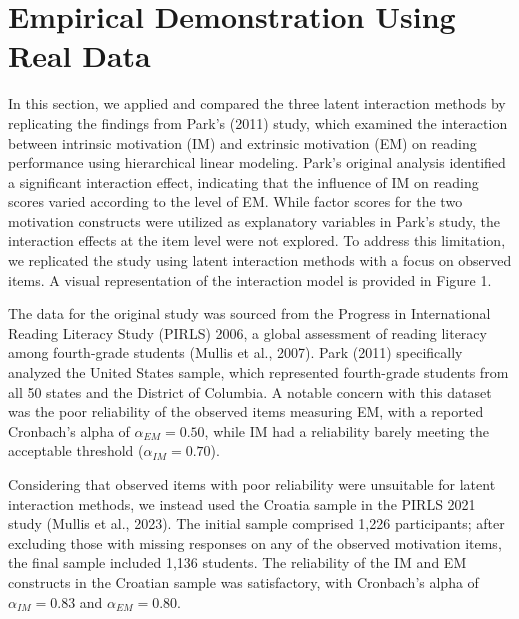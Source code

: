\documentclass[
  man,mask]{apa6}
\begin{document}
\section{Empirical Demonstration Using Real Data}\label{empirical-demonstration-using-real-data}

In this section, we applied and compared the three latent interaction methods by replicating the findings from Park's (2011) study, which examined the interaction between intrinsic motivation (IM) and extrinsic motivation (EM) on reading performance using hierarchical linear modeling. Park's original analysis identified a significant interaction effect, indicating that the influence of IM on reading scores varied according to the level of EM. While factor scores for the two motivation constructs were utilized as explanatory variables in Park's study, the interaction effects at the item level were not explored. To address this limitation, we replicated the study using latent interaction methods with a focus on observed items. A visual representation of the interaction model is provided in Figure 1.

The data for the original study was sourced from the Progress in International Reading Literacy Study (PIRLS) 2006, a global assessment of reading literacy among fourth-grade students (Mullis et al., 2007). Park (2011) specifically analyzed the United States sample, which represented fourth-grade students from all 50 states and the District of Columbia. A notable concern with this dataset was the poor reliability of the observed items measuring EM, with a reported Cronbach's alpha of \(\alpha_{EM} = 0.50\), while IM had a reliability barely meeting the acceptable threshold (\(\alpha_{IM} = 0.70\)).

Considering that observed items with poor reliability were unsuitable for latent interaction methods, we instead used the Croatia sample in the PIRLS 2021 study (Mullis et al., 2023). The initial sample comprised 1,226 participants; after excluding those with missing responses on any of the observed motivation items, the final sample included 1,136 students. The reliability of the IM and EM constructs in the Croatian sample was satisfactory, with Cronbach's alpha of \(\alpha_{IM} = 0.83\) and \(\alpha_{EM} = 0.80\).
\end{document}
